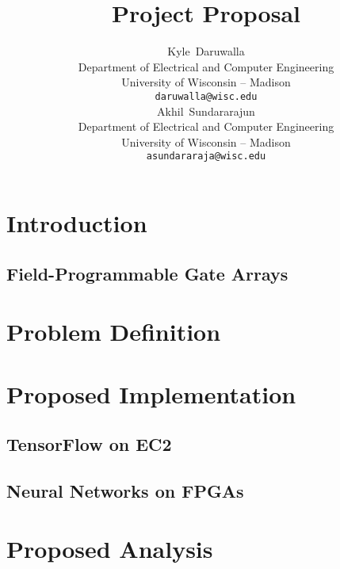 \documentclass{article}
\title{Project Proposal}
\author{
    Kyle~Daruwalla \\
    Department of Electrical and Computer Engineering \\
    University of Wisconsin -- Madison \\
    \texttt{daruwalla@wisc.edu} \\
    \And
    Akhil~Sundararajun \\
    Department of Electrical and Computer Engineering \\
    University of Wisconsin -- Madison \\
    \texttt{asundararaja@wisc.edu} \\
}
\begin{document}
\maketitle


\begin{abstract}
    
\end{abstract}

\section{Introduction}

\subsection{Field-Programmable Gate Arrays}


\section{Problem Definition}


\section{Proposed Implementation}

\subsection{TensorFlow on EC2}

\subsection{Neural Networks on FPGAs}


\section{Proposed Analysis}


\nocite{*}

\end{document}
